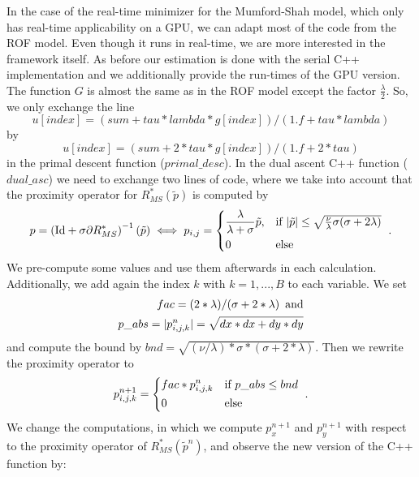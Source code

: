 \documentclass[abstracton]{scrreprt}
\begin{document}
        In the case of the real-time minimizer for the Mumford-Shah model, which only has real-time applicability on a GPU, we can adapt most of the code from the ROF model. Even though it runs in real-time, we are more interested in the framework itself. As before our estimation is done with the serial C++ implementation and we additionally provide the run-times of the GPU version. The function $G$ is almost the same as in the ROF model except the factor $\frac{\lambda}{2}$. So, we only exchange the line
            $$
                u[index] = (sum + tau * lambda * g[index]) / (1.f + tau * lambda)
            $$
        by
            $$
                u[index] = (sum + 2 * tau * g[index]) / (1.f + 2 * tau)
            $$
        in the primal descent function ($primal\_desc$). In the dual ascent C++ function ($dual\_asc$) we need to exchange two lines of code, where we take into account that the proximity operator for $R_{MS}^{\ast}(\tilde{p})$ is computed by
            $$
                p = \left( \textnormal{Id} + \sigma \partial R_{MS}^{\ast} \right)^{-1}(\tilde{p}) \iff p_{i,j} =
                    \begin{dcases*}
                        \frac{\lambda}{\lambda + \sigma} \tilde{p}, & \textnormal{if $|\tilde{p}| \le \sqrt{\frac{\nu}{\lambda}\sigma(\sigma + 2\lambda)}$} \\
                        0 & \textnormal{else}
                    \end{dcases*}.
            $$
        We pre-compute some values and use them afterwards in each calculation. Additionally, we add again the index $k$ with $k = 1, ..., B$ to each variable. We set
            \begin{eqnarray}
                fac = (2 * \lambda) / (\sigma + 2 * \lambda) \,\,\, \textnormal{and} \notag \\
                p\_abs = |p^{n}_{i,j,k}| = \sqrt{dx*dx+dy*dy} \notag
            \end{eqnarray}
        and compute the bound by $bnd = \sqrt{(\nu / \lambda) * \sigma * (\sigma + 2 * \lambda)}$. Then we rewrite the proximity operator to
            $$
                p^{n+1}_{i,j,k} =
                    \begin{dcases*}
                        fac*p^{n}_{i,j,k} & \textnormal{if $p\_abs \le bnd$} \\
                        0 & \textnormal{else}
                    \end{dcases*}.
            $$
        We change the computations, in which we compute $p^{n+1}_{x}$ and $p^{n+1}_{y}$ with respect to the proximity operator of $R_{MS}^{\ast}(\tilde{p}^{n})$, and observe the new version of the C++ function by:
\end{document}
